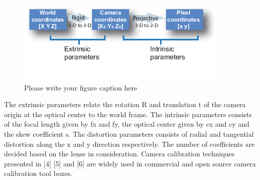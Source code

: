 \begin{figure}[H]
  \includegraphics[width=\textwidth]{./figures/imageParams.png}
\caption{Please write your figure caption here}
\label{fig:2}       %
\end{figure}

The extrinsic parameters relate the rotation R and translation t of the camera origin at the optical center to the world frame. The intrinsic parameters consists of the focal length given by fx and fy, the optical center given by cx and cy and the skew coefficient s. The distortion parameters consists of radial and tangential distortion along the x and y direction respectively. The number of coefficients are decided based on the lense in consideration. Camera calibration techniques presented in [4] [5] and [6] are widely used in commercial and open source camera calibration tool boxes.